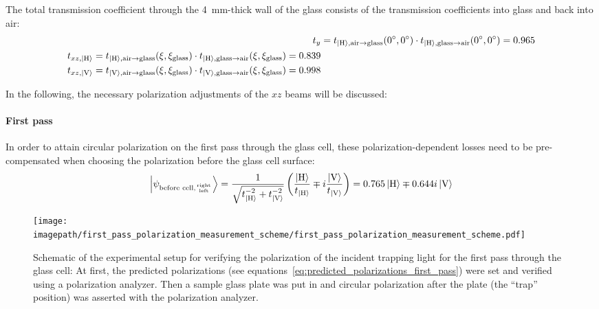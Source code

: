 The total transmission coefficient through the \SI{4}{\milli\meter}-thick wall of the glass consists of the transmission coefficients into glass and back into air:
\begin{align}
    t_{y} &= t_{\Ket{\text{H}}, \text{air} \rightarrow \text{glass}}(\SI{0}{\degree}, \SI{0}{\degree})  \cdot t_{\Ket{\text{H}}, \text{glass} \rightarrow \text{air}}(\SI{0}{\degree}, \SI{0}{\degree}) = \SI{0.965}{} \\
    \begin{split}
        t_{xz, \Ket{\text{H}}} &= t_{\Ket{\text{H}}, \text{air} \rightarrow \text{glass}}(\xi, \xi_\text{glass})  \cdot t_{\Ket{\text{H}}, \text{glass} \rightarrow \text{air}}(\xi, \xi_\text{glass}) = \SI{0.839}{} \\
        t_{xz, \Ket{\text{V}}} &= t_{\Ket{\text{V}}, \text{air} \rightarrow \text{glass}}(\xi, \xi_\text{glass})  \cdot t_{\Ket{\text{V}}, \text{glass} \rightarrow \text{air}}(\xi, \xi_\text{glass}) = \SI{0.998}{}
    \end{split}
\end{align}

In the following, the necessary polarization adjustments of the $xz$ beams will be discussed:

\paragraph{First pass}
In order to attain circular polarization on the first pass through the glass cell, these polarization-dependent losses need to be pre-compensated when choosing the polarization before the glass cell surface:
\begin{align}
    \label{eq:predicted_polarizations_first_pass}
    \Ket{\psi_{\text{before cell,} {\text{right} \atop \text{left}}}} 
    = \frac{1}{\sqrt{t_{\Ket{\text{H}}}^{-2} + t_{\Ket{\text{V}}}^{-2}}}
        \left(\frac{\Ket{\text{H}}}{t_{\Ket{\text{H}}}} \mp i \frac{\Ket{\text{V}}}{t_{\Ket{\text{V}}}} \right)
    = 0.765 \Ket{\text{H}} \mp 0.644i \Ket{\text{V}}
\end{align}

\begin{figure}
    \centering
    \texttt{[image: \\imagepath/first\_pass\_polarization\_measurement\_scheme/first\_pass\_polarization\_measurement\_scheme.pdf]}
    \caption{Schematic of the experimental setup for verifying the polarization of the incident trapping light for the first pass through the glass cell: At first, the predicted polarizations (see equations~\ref{eq:predicted_polarizations_first_pass}) were set and verified using a polarization analyzer. Then a sample glass plate was put in and circular polarization after the plate (the ``trap'' position) was asserted with the polarization analyzer.}
    \label{fig:first_pass_polarization_measurement_scheme}
\end{figure}

